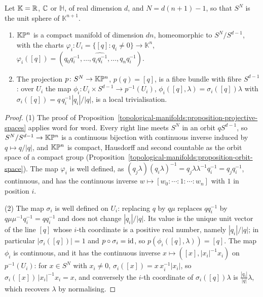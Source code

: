 \begin{proposition}\label{topological-manifolds:proposition-hopf-fibrations}
Let $\mathbb{K} = \mathbb{R}$, $\mathbb{C}$ or $\mathbb{H}$, of real dimension $d$, and $N = d(n + 1) - 1$, so that $S^N$ is the unit sphere of $\mathbb{K}^{n+1}$.
\begin{enumerate}
\item $\mathbb{K}\mathbb{P}^n$ is a compact manifold of dimension $dn$, homeomorphic to $S^N/S^{d-1}$, with the charts $\varphi_i \colon U_i = \{[q] : q_i \neq 0\} \to \mathbb{K}^n$,
$\varphi_i([q]) = (q_0q_i^{-1}, \ldots, \widehat{q_iq_i^{-1}}, \ldots, q_nq_i^{-1})$.
\item The projection $p \colon S^N \to \mathbb{K}\mathbb{P}^n$, $p(q) = [q]$, is a fibre bundle with fibre $S^{d-1}$: over $U_i$ the map $\phi_i \colon U_i \times S^{d-1} \to p^{-1}(U_i)$, $\phi_i([q], \lambda) = \sigma_i([q])\lambda$
with $\sigma_i([q]) = q\,q_i^{-1}|q_i|/|q|$, is a local trivialisation.
\end{enumerate}
\end{proposition}

\begin{proof}
(1) The proof of Proposition~\ref{topological-manifolds:proposition-projective-spaces} applies word for word. Every right line meets $S^N$ in an orbit $qS^{d-1}$, so $S^N/S^{d-1} \to \mathbb{K}\mathbb{P}^n$ is a continuous
bijection with continuous inverse induced by $q \mapsto q/|q|$, and $\mathbb{K}\mathbb{P}^n$ is compact, Hausdorff and second countable as the orbit space of a compact group (Proposition~\ref{topological-manifolds:proposition-orbit-space}).
The map $\varphi_i$ is well defined, as $(q_j\lambda)(q_i\lambda)^{-1} = q_j\lambda\lambda^{-1}q_i^{-1} = q_jq_i^{-1}$, continuous, and has the continuous inverse $w \mapsto [w_0 : \cdots : 1 : \cdots : w_n]$ with $1$ in position $i$.

(2) The map $\sigma_i$ is well defined on $U_i$: replacing $q$ by $q\mu$ replaces $qq_i^{-1}$ by $q\mu\mu^{-1}q_i^{-1} = qq_i^{-1}$ and does not change $|q_i|/|q|$. Its value is the unique unit vector of the line $[q]$ whose
$i$-th coordinate is a positive real number, namely $|q_i|/|q|$; in particular $|\sigma_i([q])| = 1$ and $p \circ \sigma_i = \mathrm{id}$, so $p(\phi_i([q], \lambda)) = [q]$. The map $\phi_i$ is continuous, and it has the continuous inverse
$x \mapsto ([x], |x_i|^{-1}x_i)$ on $p^{-1}(U_i)$: for $x \in S^N$ with $x_i \neq 0$, $\sigma_i([x]) = x\,x_i^{-1}|x_i|$, so $\sigma_i([x])\,|x_i|^{-1}x_i = x$, and conversely the $i$-th coordinate of $\sigma_i([q])\lambda$ is
$\frac{|q_i|}{|q|}\lambda$, which recovers $\lambda$ by normalising.
\end{proof}

